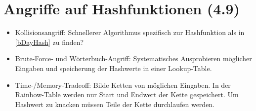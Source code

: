 \section{Angriffe auf Hashfunktionen (4.9)}
\begin{itemize}
  \item Kollisionsangriff: Schnellerer Algorithmus spezifisch zur Hashfunktion als in \ref{bDayHash} zu finden?
  \item Brute-Force- und Wörterbuch-Angriff: Systematisches  Ausprobieren möglicher Eingaben und speicherung der Hashwerte in einer Lookup-Table.
  \item Time-/Memory-Tradeoff: Bilde Ketten von möglichen Eingaben. In der Rainbow-Table werden nur Start und Endwert der Kette gespeichert. Um Hashwert zu knacken müssen Teile der Kette durchlaufen werden.
\end{itemize}

 







